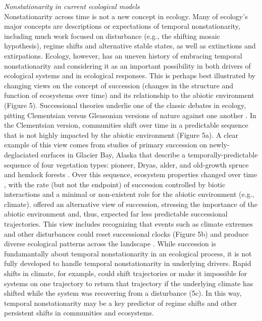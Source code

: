 \documentclass[11pt,a4paper,oneside]{article}
\begin{document}
\noindent \emph{Nonstationarity in current ecological models}\\
\noindent Nonstationarity across time is not a new concept in ecology. Many of ecology's major concepts are descriptions or expectations of temporal nonstationarity, including much work focused on disturbance (e.g., the shifting mosaic hypothesis), regime shifts and alternative stable states, as well as extinctions and extirpations. Ecology, however, has an uneven history of embracing temporal nonstationarity and considering it as an important possibility in both drivers of ecological systems and in ecological responses. This is perhaps best illustrated by changing views on the concept of succession (changes in the structure and function of ecosystems over time) and its relationship to the abiotic environment (Figure 5). Successional theories underlie one of the classic debates in ecology, pitting Clementsian versus Gleasonian versions of nature against one another \citep{clementsbook,gleason1926}. In the Clementsian version, communities shift over time in a predictable sequence that is not highly impacted by the abiotic environment (Figure 5a). A clear example of this view comes from studies of primary succession on newly-deglaciated surfaces in Glacier Bay, Alaska that describe a temporally-predictable sequence of four vegetation types: pioneer, Dryas, alder, and old-growth spruce and hemlock forests \citep{cooper1923}. Over this sequence, ecosystem properties changed over time \citep{Chapin1994}, with the rate (but not the endpoint) of succession controlled by biotic interactions and a minimal or non-existent role for the abiotic environment (e.g., climate). \citet{gleason1926} offered an alternative view of succession, stressing the importance of the abiotic environment and, thus, expected far less predictable successional trajectories. This view includes recognizing that events such as climate extremes and other disturbances could reset successional clocks (Figure 5b) and produce diverse ecological patterns across the landscape \citep{Levin:1992rg,romme2011}. While succession is fundamantally about temporal nonstationarity in an ecological process, it is not fully developed to handle temporal nonstationarity in underlying drivers. Rapid shifts in climate, for example, could shift trajectories or make it impossible for systems on one trajectory to return that trajectory if the underlying climate has shifted while the system was recovering from a disturbance (5c). In this way, temporal nonstationarity may be a key predictor of regime shifts and other persistent shifts in communities and ecosystems.
\end{document}
